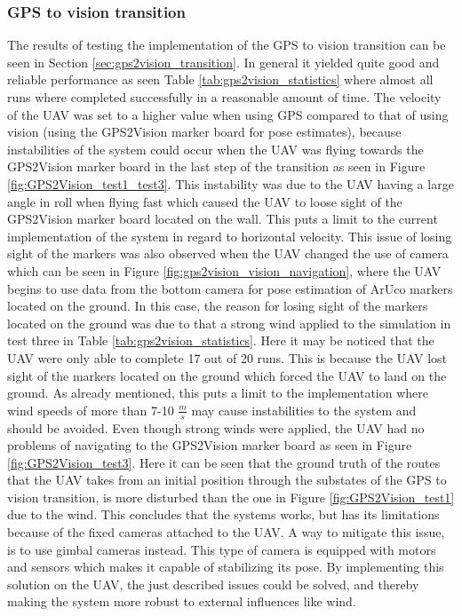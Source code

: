 \documentclass[../Head/report.tex]{subfiles}
\begin{document}
\subsubsection*{GPS to vision transition}
The results of testing the implementation of the GPS to vision transition can be seen in Section \ref{sec:gps2vision_transition}. In general it yielded quite good and reliable performance as seen Table \ref{tab:gps2vision_statistics} where almost all runs where completed successfully in a reasonable amount of time. The velocity of the UAV was set to a higher value when using GPS compared to that of using vision (using the GPS2Vision marker board for pose estimates), because instabilities of the system could occur when the UAV was flying towards the GPS2Vision marker board in the last step of the transition as seen in Figure \ref{fig:GPS2Vision_test1_test3}. This instability was due to the UAV having a large angle in roll when flying fast which caused the UAV to loose sight of the GPS2Vision marker board located on the wall. This puts a limit to the current implementation of the system in regard to horizontal velocity. This issue of losing sight of the markers was also observed when the UAV changed the use of camera which can be seen in Figure \ref{fig:gps2vision_vision_navigation}, where the UAV begins to use data from the bottom camera for pose estimation of ArUco markers located on the ground. In this case, the reason for losing sight of the markers located on the ground was due to that a strong wind applied to the simulation in test three in Table \ref{tab:gps2vision_statistics}. Here it may be noticed that the UAV were only able to complete 17 out of 20 runs. This is because the UAV lost sight of the markers located on the ground which forced the UAV to land on the ground. As already mentioned, this puts a limit to the implementation where wind speeds of more than 7-10 $\frac{m}{s}$ may cause instabilities to the system and should be avoided. Even though strong winds were applied, the UAV had no problems of navigating to the GPS2Vision marker board as seen in Figure \ref{fig:GPS2Vision_test3}. Here it can be seen that the ground truth of the routes that the UAV takes from an initial position through the substates of the GPS to vision transition, is more disturbed than the one in Figure \ref{fig:GPS2Vision_test1} due to the wind. This concludes that the systems works, but has its limitations because of the fixed cameras attached to the UAV. A way to mitigate this issue, is to use gimbal cameras instead. This type of camera is equipped with motors and sensors which makes it capable of stabilizing its pose. By implementing this solution on the UAV, the just described issues could be solved, and thereby making the system more robust to external influences like wind.     
\end{document}
